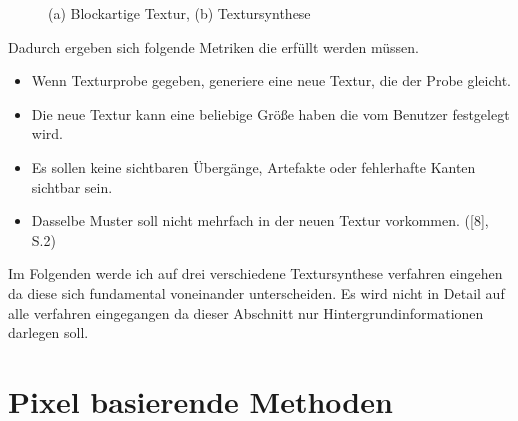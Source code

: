 \documentclass[12pt]{report}
\begin{document}
\begin{figure}[H]
    \centering
    \qquad
    \caption{(a) Blockartige Textur, (b) Textursynthese}%
\end{figure}

\noindent Dadurch ergeben sich folgende Metriken die erfüllt werden müssen.

\begin{itemize}
    \item Wenn Texturprobe gegeben, generiere eine neue Textur, die der Probe gleicht.
    \item Die neue Textur kann eine beliebige Größe haben die vom Benutzer festgelegt wird.
    \item Es sollen keine sichtbaren Übergänge, Artefakte oder fehlerhafte Kanten sichtbar sein.
    \item Dasselbe Muster soll nicht mehrfach in der neuen Textur vorkommen. {([8], S.2)}
\end{itemize}

\noindent Im Folgenden werde ich auf drei verschiedene Textursynthese verfahren eingehen da diese sich fundamental voneinander unterscheiden.
Es wird nicht in Detail auf alle verfahren eingegangen da dieser Abschnitt nur Hintergrundinformationen darlegen soll.

\section{Pixel basierende Methoden}
\end{document}
